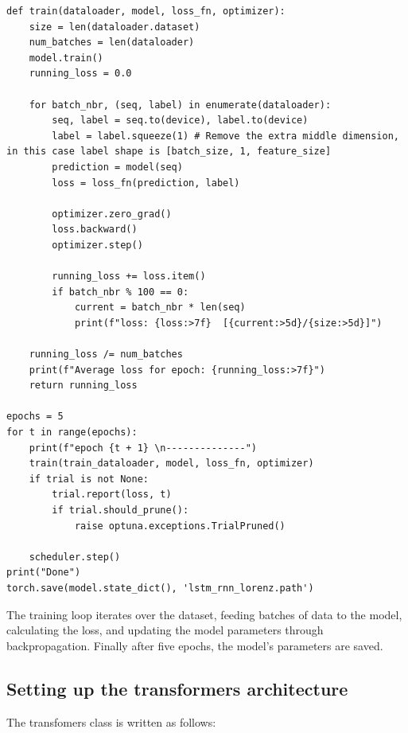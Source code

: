 \documentclass[11pt]{article}
\begin{document}
\begin{lstlisting}
def train(dataloader, model, loss_fn, optimizer):
    size = len(dataloader.dataset)
    num_batches = len(dataloader)
    model.train()
    running_loss = 0.0

    for batch_nbr, (seq, label) in enumerate(dataloader):
        seq, label = seq.to(device), label.to(device)
        label = label.squeeze(1) # Remove the extra middle dimension, in this case label shape is [batch_size, 1, feature_size]
        prediction = model(seq)
        loss = loss_fn(prediction, label)

        optimizer.zero_grad()
        loss.backward()
        optimizer.step()

        running_loss += loss.item()
        if batch_nbr % 100 == 0:
            current = batch_nbr * len(seq)
            print(f"loss: {loss:>7f}  [{current:>5d}/{size:>5d}]")

    running_loss /= num_batches
    print(f"Average loss for epoch: {running_loss:>7f}")
    return running_loss

epochs = 5
for t in range(epochs):
    print(f"epoch {t + 1} \n--------------")
    train(train_dataloader, model, loss_fn, optimizer)
    if trial is not None:
        trial.report(loss, t)
        if trial.should_prune():
            raise optuna.exceptions.TrialPruned()

    scheduler.step()
print("Done")
torch.save(model.state_dict(), 'lstm_rnn_lorenz.path')
\end{lstlisting}
The training loop iterates over the dataset, feeding batches of data to the model, calculating the loss, and updating the model parameters through backpropagation. Finally after five epochs, the model's parameters are saved.

\subsection{Setting up the transformers architecture}

The transfomers class is written as follows:
\end{document}
